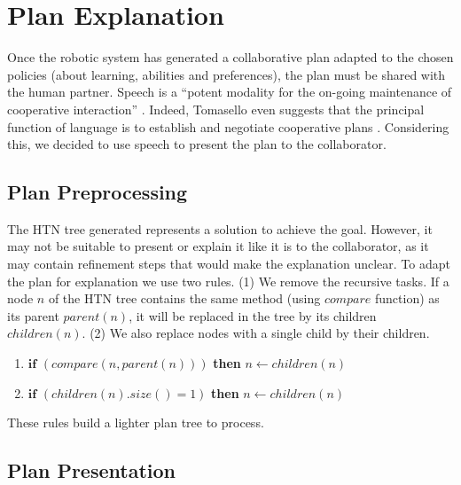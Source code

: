 \section{Plan Explanation}



Once the robotic system has generated a collaborative plan adapted to the chosen policies (about learning, abilities and preferences), the plan must be shared with the human partner.
Speech is a ``potent modality for the on-going maintenance of cooperative interaction'' \cite{Lallee2013}. Indeed, Tomasello even suggests that the principal function of language is to establish and negotiate cooperative plans \cite{tomasello2005}.
Considering this, we decided to use speech to present the plan to the collaborator.

\subsection{Plan Preprocessing}
The HTN tree generated represents a solution to achieve the goal. However, it may not be suitable to present or explain it like it is to the collaborator, as it may contain refinement steps that would make the explanation unclear. To adapt the plan for explanation we use two rules.
%
(1) We remove the recursive tasks. If a node $n$ of the HTN tree contains the same method (using $compare$ function) as its parent $parent(n)$, it will be replaced in the tree by its children $children(n)$. (2) We also replace nodes with a single child by their children.
\begin{enumerate}
\item $\textbf{if}$ $(compare(n, parent(n)))$ \textbf{then} $n \leftarrow children(n)$
\item $\textbf{if}$ $(children(n).size() = 1)$ \textbf{then} $n \leftarrow children(n)$
\end{enumerate}
These rules build a lighter plan tree to process.


\subsection{Plan Presentation}

